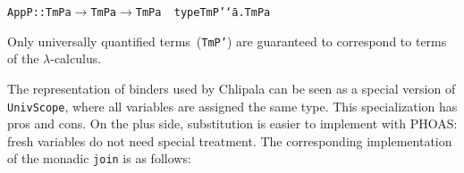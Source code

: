 \documentclass[9pt,authoryear]{sigplanconf}
\begin{document}
{{}\vphantom{$\{$}}\texttt{\mbox{\hspace{0.50em}}}\texttt{\mbox{\hspace{0.50em}}}\texttt{AppP}\texttt{\mbox{\hspace{0.50em}}}\texttt{{:}{:}}\texttt{\mbox{\hspace{0.50em}}}\texttt{TmP}\texttt{\mbox{\hspace{0.50em}}}\texttt{a}\texttt{\mbox{\hspace{0.50em}}}\texttt{$ \rightarrow $}\texttt{\mbox{\hspace{0.50em}}}\texttt{TmP}\texttt{\mbox{\hspace{0.50em}}}\texttt{a}\texttt{\mbox{\hspace{0.50em}}}\texttt{$ \rightarrow $}\texttt{\mbox{\hspace{0.50em}}}\texttt{TmP}\texttt{\mbox{\hspace{0.50em}}}\texttt{a}\texttt{{\nopagebreak \newline%
}\vphantom{$\{$}}\texttt{{\nopagebreak \newline%
}\vphantom{$\{$}}\texttt{type}\texttt{\mbox{\hspace{0.50em}}}\texttt{TmP{'}}\texttt{\mbox{\hspace{0.50em}}}\texttt{{\char `\=}}\texttt{\mbox{\hspace{0.50em}}}\texttt{\makebox[1.22ex][c]{$ \forall $}}\texttt{\mbox{\hspace{0.50em}}}\texttt{a}\texttt{.}\texttt{\mbox{\hspace{0.50em}}}\texttt{TmP}\texttt{\mbox{\hspace{0.50em}}}\texttt{a}\texttt{{\nopagebreak \newline%
}\vphantom{$\{$}}%


%
Only universally quantified terms{~}(\texttt{TmP{'}}) are guaranteed to
    correspond to terms of the $ \lambda $-calculus.%


%
The representation of binders used by Chlipala can be seen as
    a special version of \texttt{UnivScope}, where all variables are
    assigned the same type. This specialization has pros and cons. On
    the plus side, substitution is easier to implement with PHOAS{:}
    fresh variables do not need special treatment. The corresponding
    implementation of the monadic \texttt{join} is as follows{:}%


{\nopagebreak }
\end{document}
